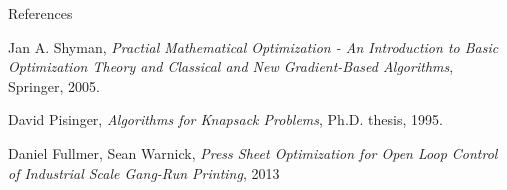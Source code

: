 \documentclass[10pt,utf8,presentation]{beamer}
\begin{document}
\begin{frame}{References}

 \begin{thebibliography}{9}

  Jan A. Shyman,
  \emph{Practial Mathematical Optimization - An Introduction to Basic Optimization Theory and Classical and New Gradient-Based Algorithms},
  Springer,
  2005.

  David Pisinger,
  \emph{Algorithms for Knapsack Problems},
  Ph.D. thesis, 1995.

  Daniel Fullmer, Sean Warnick,
  \emph{Press Sheet Optimization for Open Loop Control of Industrial Scale
Gang-Run Printing},
  2013
  
\end{thebibliography}
\end{frame}
\end{document}
